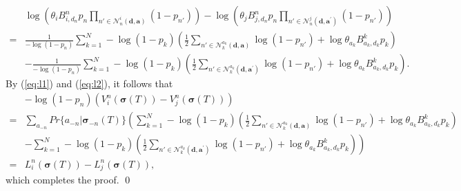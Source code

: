 \begin{align}
 & \log\left(\theta_{i}B_{i,d_{n}}^{n}p_{n}\prod_{n'\in\mathcal{N}_{n}^{i}(\boldsymbol{d},\boldsymbol{a})}(1-p_{n'})\right)-\log\left(\theta_{j}B_{j,d_{n}}^{n}p_{n}\prod_{n'\in\mathcal{N}_{n}^{j}(\boldsymbol{d},\boldsymbol{a}^{'})}(1-p_{n'})\right)\nonumber \\
= & \frac{1}{-\log(1-p_{n})}\sum_{k=1}^{N}-\log(1-p_{k})\left(\frac{1}{2}\sum_{n'\in\mathcal{N}_{k}^{a_{k}}(\boldsymbol{d},\boldsymbol{a})}\log(1-p_{n'})+\log\theta_{a_{k}}B_{a_{k},d_{k}}^{k}p_{k}\right)\nonumber \\
 & -\frac{1}{-\log(1-p_{n})}\sum_{k=1}^{N}-\log(1-p_{k})\left(\frac{1}{2}\sum_{n'\in\mathcal{N}_{k}^{a_{k}}(\boldsymbol{d},\boldsymbol{a}^{'})}\log(1-p_{n'})+\log\theta_{a_{k}}B_{a_{k},d_{k}}^{k}p_{k}\right).\label{eq:l2}\end{align}
By (\ref{eq:l1}) and (\ref{eq:l2}), it follows that\begin{align*}
 & -\log(1-p_{n})\left(V_{i}^{n}(\boldsymbol{\sigma}(T))-V_{j}^{n}(\boldsymbol{\sigma}(T))\right)\\
= & \sum_{a_{-n}}Pr\{a_{-n}|\boldsymbol{\sigma}_{-n}(T)\}\left(\sum_{k=1}^{N}-\log(1-p_{k})\right.\left(\frac{1}{2}\sum_{n'\in\mathcal{N}_{k}^{a_{k}}(\boldsymbol{d},\boldsymbol{a})}\log(1-p_{n'})+\log\theta_{a_{k}}B_{a_{k},d_{k}}^{k}p_{k}\right)\\
 & -\sum_{k=1}^{N}-\log(1-p_{k})\left.\left(\frac{1}{2}\sum_{n'\in\mathcal{N}_{k}^{a_{k}}(\boldsymbol{d},\boldsymbol{a}^{'})}\log(1-p_{n'})+\log\theta_{a_{k}}B_{a_{k},d_{k}}^{k}p_{k}\right)\right)\\
= & L_{i}^{n}(\boldsymbol{\sigma}(T))-L_{j}^{n}(\boldsymbol{\sigma}(T)),\end{align*}
which completes the proof. \qed

